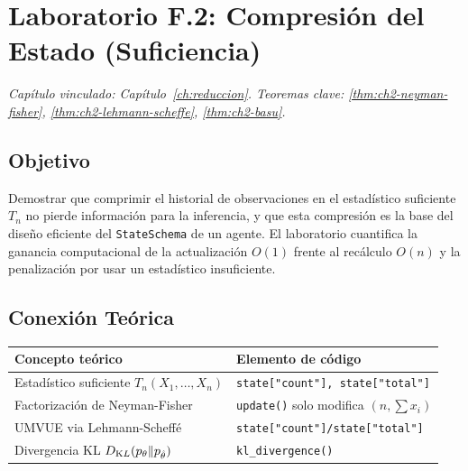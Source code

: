 \section{Laboratorio F.2: Compresión del Estado (Suficiencia)}
\label{lab:F2}
\textit{Capítulo vinculado: Capítulo~\ref{ch:reduccion}.
Teoremas clave: \ref{thm:ch2-neyman-fisher}, \ref{thm:ch2-lehmann-scheffe},
\ref{thm:ch2-basu}.}

\bigskip

\subsection*{Objetivo}

Demostrar que comprimir el historial de observaciones en el estadístico
suficiente $T_n$ no pierde información para la inferencia, y que esta
compresión es la base del diseño eficiente del \texttt{StateSchema} de un
agente. El laboratorio cuantifica la ganancia computacional de la actualización
$O(1)$ frente al recálculo $O(n)$ y la penalización por usar un estadístico
insuficiente.

\subsection*{Conexión Teórica}

\begin{center}
\small
\begin{tabular}{ll}
\toprule
\textbf{Concepto teórico} & \textbf{Elemento de código} \\
\midrule
Estadístico suficiente $T_n(X_1,\ldots,X_n)$ & \texttt{state["count"], state["total"]} \\
Factorización de Neyman-Fisher & \texttt{update()} solo modifica $(n, \sum x_i)$ \\
UMVUE via Lehmann-Scheffé & \texttt{state["count"]/state["total"]} \\
Divergencia KL $D_{\textrm KL}(p_\theta\|p_{\hat\theta})$ & \texttt{kl\_divergence()} \\
\bottomrule
\end{tabular}
\end{center}

